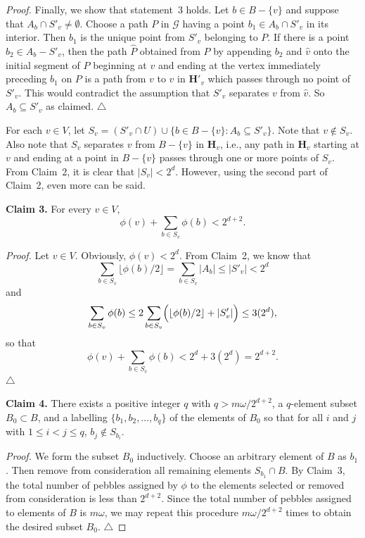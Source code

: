 \documentclass{amsart}
\theoremstyle{remark}
\newcommand{\bfH}{\mathbf{H}}
\begin{document}
\begin{proof}
Finally, we show that statement~3 holds.  
Let $b\in B-\{v\}$ and suppose that $A_b\cap
S'_v\neq\emptyset$.  Choose a path $P$ in $\mathcal{G}$
having a point $b_1\in A_b\cap S'_v$ in its interior.  Then
$b_1$ is the unique point from $S'_v$ belonging to $P$.  If there
is a point $b_2\in A_b-S'_v$, then the path $\hat{P}$ obtained from
$P$ by appending $b_2$ and $\hat{v}$ onto the initial segment of $P$
beginning at $v$ and ending at the vertex immediately preceding
$b_1$ on $P$ is a path from $v$ to $\hat{v}$ in $\bfH'_v$
which passes through no point of $S'_v$.  This would contradict the 
assumption that $S'_v$ separates $v$ from $\hat{v}$.  
So $A_b\subseteq S'_v$ as claimed.
\hfill$\triangle$

\medskip
For each $v\in V$, let $S_v=(S'_v\cap U)\cup\{b\in B-\{v\}:A_b\subseteq
S'_v\}$.  Note that $v\not\in S_v$.  
Also note that $S_v$ separates 
$v$ from $B-\{v\}$ in $\bfH_v$, i.e., any path in $\bfH_v$ starting at
$v$ and ending at a point in $B-\{v\}$ passes through one or more
points of $S_v$.  From Claim~2, it is clear that 
$|S_v|<2^d$.  However, using the second part of Claim~2, even
more can be said.  

\medskip\noindent\textbf{Claim 3.}
For every $v\in V$,
\[
\phi(v)+\sum_{b\in S_v}\phi(b)<2^{d+2}.
\]

\medskip\noindent\textit{Proof.} Let $v\in V$. Obviously, $\phi(v)<2^d$.
From Claim~2, we know that
\[\sum_{b\in S_v}\lfloor\phi(b)/2\rfloor
= \sum_{b\in S_v}|A_b|\le|S'_v|< 2^d\]
and
\[\sum_{b\in S_v}\phi(b)\le 
2\sum_{b\in S_v}\Bigl(\lfloor\phi(b)/2\rfloor+|S'_v|\Bigr)\le 3(2^d),\]
so that
\[
\phi(v)+\sum_{b\in S_v}\phi(b)<2^d+3(2^d)=2^{d+2}.
\]
\hfill$\triangle$

\medskip
\noindent\textbf{Claim 4.}  There exists a positive integer 
$q$ with $q> m\omega/2^{d+2}$, a $q$-element subset 
$B_0\subset B$, and a labelling $\{b_1,b_2,\dots,b_q\}$ of the
elements of $B_0$ so that for all $i$ and $j$ with $1\le i<j\le q$,
$b_j\not\in S_{b_i}$.  

\medskip
\noindent\textit{Proof.}
We form the subset $B_0$ inductively.  Choose an
arbitrary element of $B$ as $b_1$.  Then
remove from consideration all remaining elements $S_{b_1}\cap B$.  
By Claim~3, the total number of pebbles
assigned by $\phi$ to the elements selected or removed from consideration 
is less than $2^{d+2}$.
Since the total number of pebbles assigned to elements of
$B$ is $m\omega$, we may repeat this procedure $m\omega/2^{d+2}$
times to obtain the desired subset $B_0$.
\hfill$\triangle$


\end{proof}
\end{document}
